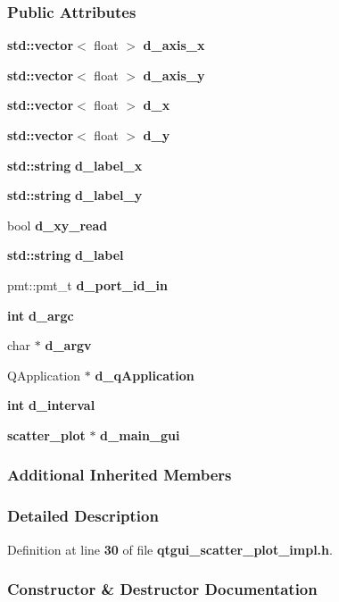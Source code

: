 \subsubsection*{Public Attributes}
\begin{DoxyCompactItemize}
\item 
{\bf std\+::vector}$<$ float $>$ {\bf d\+\_\+axis\+\_\+x}
\item 
{\bf std\+::vector}$<$ float $>$ {\bf d\+\_\+axis\+\_\+y}
\item 
{\bf std\+::vector}$<$ float $>$ {\bf d\+\_\+x}
\item 
{\bf std\+::vector}$<$ float $>$ {\bf d\+\_\+y}
\item 
{\bf std\+::string} {\bf d\+\_\+label\+\_\+x}
\item 
{\bf std\+::string} {\bf d\+\_\+label\+\_\+y}
\item 
bool {\bf d\+\_\+xy\+\_\+read}
\item 
{\bf std\+::string} {\bf d\+\_\+label}
\item 
pmt\+::pmt\+\_\+t {\bf d\+\_\+port\+\_\+id\+\_\+in}
\item 
{\bf int} {\bf d\+\_\+argc}
\item 
char $\ast$ {\bf d\+\_\+argv}
\item 
Q\+Application $\ast$ {\bf d\+\_\+q\+Application}
\item 
{\bf int} {\bf d\+\_\+interval}
\item 
{\bf scatter\+\_\+plot} $\ast$ {\bf d\+\_\+main\+\_\+gui}
\end{DoxyCompactItemize}
\subsubsection*{Additional Inherited Members}


\subsubsection{Detailed Description}


Definition at line {\bf 30} of file {\bf qtgui\+\_\+scatter\+\_\+plot\+\_\+impl.\+h}.



\subsubsection{Constructor \& Destructor Documentation}
